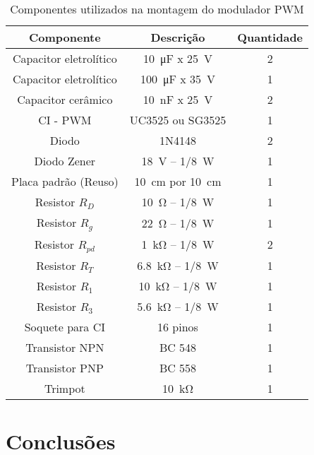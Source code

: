 \begin{table}[!ht]
	\centering
	\caption{Componentes utilizados na montagem do modulador PWM}
	\label{tab:componentesPWM}
	\begin{tabular}{@{}ccc@{}}
		\toprule
		\textbf{Componente} & \textbf{Descrição} & \textbf{Quantidade} \\ \midrule			
		Capacitor eletrolítico          & \SI{10}{\micro\farad} x \SI{25}{\V}      & 2  \\		
		Capacitor eletrolítico          & \SI{100}{\micro\farad} x \SI{35}{\V}      & 1  \\
		Capacitor cerâmico          & \SI{10}{\nano\farad} x \SI{25}{\V}      & 2  \\
			CI - PWM      & UC3525 ou SG3525            & 1                   \\
				Diodo              & 1N4148             & 2                   \\
			Diodo   Zener          &  \SI{18}{\V} -- \SI{1/8}{\W}              & 1        \\
				Placa padrão (Reuso)        & \SI{10}{\cm} por \SI{10}{\cm}         & 1    \\
				Resistor  $R_D$     & \SI{10}{\ohm} -- \SI{1/8}{\W}    & 1    \\	
		 Resistor   $R_g$    & \SI{22}{\ohm} -- \SI{1/8}{\W}    & 1    \\
	    Resistor  $R_{pd}$     & \SI{1}{\kilo\ohm} -- \SI{1/8}{\W}    & 2     \\	     
	       Resistor  $R_T$     & \SI{6.8}{\kilo\ohm} -- \SI{1/8}{\W}    & 1    \\
	        Resistor  $R_1$     & \SI{10}{\kilo\ohm} -- \SI{1/8}{\W}    & 1    \\ 
	       Resistor  $R_3$     & \SI{5.6}{\kilo\ohm} -- \SI{1/8}{\W}    & 1    \\              
	          	Soquete para CI        & 16 pinos           & 1                   \\
	       	Transistor    NPN          & BC 548             & 1          \\
	       Transistor    PNP          & BC 558             & 1          \\
	          Trimpot       & \SI{10}{\kilo\ohm}    & 1    \\ \bottomrule	
	\end{tabular}
\end{table}



\section{Conclusões} 

